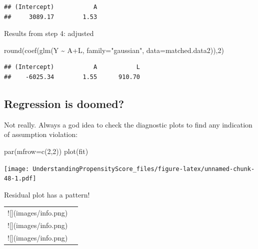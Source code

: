 \documentclass[
]{book}
\newenvironment{Shaded}{\begin{snugshade}}{\end{snugshade}}
\newcommand{\AttributeTok}[1]{\textcolor[rgb]{0.77,0.63,0.00}{#1}}
\newcommand{\DecValTok}[1]{\textcolor[rgb]{0.00,0.00,0.81}{#1}}
\newcommand{\FunctionTok}[1]{\textcolor[rgb]{0.00,0.00,0.00}{#1}}
\newcommand{\NormalTok}[1]{#1}
\newcommand{\SpecialCharTok}[1]{\textcolor[rgb]{0.00,0.00,0.00}{#1}}
\newcommand{\StringTok}[1]{\textcolor[rgb]{0.31,0.60,0.02}{#1}}
\begin{document}
\begin{verbatim}
## (Intercept)           A 
##     3089.17        1.53
\end{verbatim}

Results from step 4: adjusted

\begin{Shaded}
\begin{Highlighting}[]
\FunctionTok{round}\NormalTok{(}\FunctionTok{coef}\NormalTok{(}\FunctionTok{glm}\NormalTok{(Y }\SpecialCharTok{\textasciitilde{}}\NormalTok{ A}\SpecialCharTok{+}\NormalTok{L, }\AttributeTok{family=}\StringTok{"gaussian"}\NormalTok{, }\AttributeTok{data=}\NormalTok{matched.data2)),}\DecValTok{2}\NormalTok{)}
\end{Highlighting}
\end{Shaded}

\begin{verbatim}
## (Intercept)           A           L 
##    -6025.34        1.55      910.70
\end{verbatim}

\hypertarget{regression-is-doomed}{%
\subsection{Regression is doomed?}\label{regression-is-doomed}}

Not really. Always a god idea to check the diagnostic plots to find any indication of assumption violation:

\begin{Shaded}
\begin{Highlighting}[]
\FunctionTok{par}\NormalTok{(}\AttributeTok{mfrow=}\FunctionTok{c}\NormalTok{(}\DecValTok{2}\NormalTok{,}\DecValTok{2}\NormalTok{))}
\FunctionTok{plot}\NormalTok{(fit)}
\end{Highlighting}
\end{Shaded}

\texttt{[image: UnderstandingPropensityScore\_files/figure-latex/unnamed-chunk-48-1.pdf]}

Residual plot has a pattern!

\begin{tabular}{l>{}l}
\toprule
![](images/info.png) & \cellcolor[HTML]{3A3B3C}{\textcolor{white}{Powerful machine learning method is good at prediction.}}\\
![](images/info.png) & \cellcolor[HTML]{3A3B3C}{\textcolor{white}{Propensity score methods rely on obtaining good balance.}}\\
![](images/info.png) & \cellcolor[HTML]{3A3B3C}{\textcolor{white}{Always a good idea to check analysis with multiple sensitivity analysis.}}\\
\bottomrule
\end{tabular}
\end{document}
